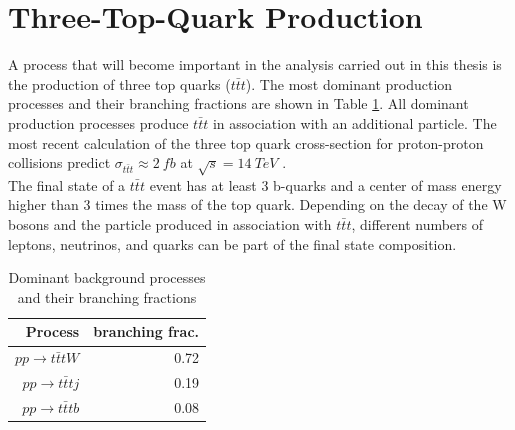 \section{Three-Top-Quark Production}
\label{sec:Theory3top}

A process that will become important in the analysis carried out in this thesis is the production of three top quarks ($t\bar{t}t$). The most dominant production processes and their branching fractions are shown in Table \ref{tab:BR3t}. All dominant production processes produce $t\bar{t}t$ in association with an additional particle. The most recent calculation of the three top quark cross-section for proton-proton collisions predict $\sigma_{t\bar{t}t} \approx \SI{2}{fb}$ at $\sqrt{s} = \SI{14}{TeV}$ \cite{3t}. \\
The final state of a $t\bar{t}t$ event has at least 3 b-quarks and a center of mass energy higher than 3 times the mass of the top quark. Depending on the decay of the W bosons and the particle produced in association with $t\bar{t}t$, different numbers of leptons, neutrinos, and quarks can be part of the final state composition.

\begin{table}[H]
\centering
\begin{tabular}{|r|r|}
\toprule
Process & branching frac. \\
\midrule
$pp \rightarrow t\bar{t}tW$ & 0.72 \\
$pp \rightarrow t\bar{t}tj$ & 0.19 \\
$pp \rightarrow t\bar{t}tb$ & 0.08 \\
\bottomrule
\end{tabular}
\caption{Dominant background processes and their branching fractions \cite{3t}}
\label{tab:BR3t}
\end{table}

